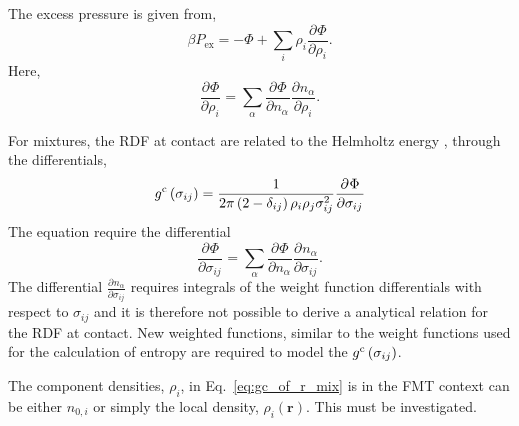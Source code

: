 \documentclass[12pt, letterpaper]{article}
\newcommand*{\pd}[3][]{\frac{\partial^{#1}#2}{\partial{#3}^{#1}}}%
\newcommand*{\lb}{\ensuremath{\left(}}
\newcommand*{\rb}{\ensuremath{\right)}}
\newcommand{\excess}{\ensuremath{\text{ex}}\xspace}
\newcommand{\contact}{\ensuremath{\text{c}}\xspace}
\begin{document}
The excess pressure is given from,
\begin{equation}
  \label{eq:fmt_pressure}
  \beta P_\excess = -\Phi + \underset{i}{\sum} \rho_i \pd{\Phi}{\rho_i}.
\end{equation}
Here,
\begin{equation}
  \label{eq:phi_rho_i}
  \pd{\Phi}{\rho_i}  = \underset{\alpha}{\sum} \pd{\Phi}{n_\alpha} \pd{n_\alpha}{\rho_i}.
\end{equation}

For mixtures, the RDF at contact are related to the Helmholtz energy
\cite[Eq. 5.29]{mulero2008}, \cite{hamad1994} through the
differentials,
\begin{equation}
  \label{eq:gc_of_r_mix}
  g^{\contact}\lb \sigma_{ij} \rb = \frac{1}{2 \pi \lb 2 - \delta_{ij} \rb \rho_i \rho_j \sigma_{ij}^2} \pd{\Phi}{\sigma_{ij}}
\end{equation}
The equation require the differential
\begin{equation}
  \label{eq:phi_sigma_ij}
  \pd{\Phi}{\sigma_{ij}} = \underset{\alpha}{\sum} \pd{\Phi}{n_\alpha} \pd{n_\alpha}{\sigma_{ij}}.
\end{equation}
The differential $\pd{n_\alpha}{\sigma_{ij}}$ requires integrals of
the weight function differentials with respect to $\sigma_{ij}$ and it
is therefore not possible to derive a analytical relation for the RDF
at contact. New weighted functions, similar to the weight functions
used for the calculation of entropy are required to model the
$g^{\contact}\lb \sigma_{ij} \rb$.

The component densities, $\rho_i$, in Eq.~\ref{eq:gc_of_r_mix} is in
the FMT context can be either $n_{0,i}$ or simply the local density,
$\rho_i(\mathbf{r})$. This must be investigated.
\end{document}
